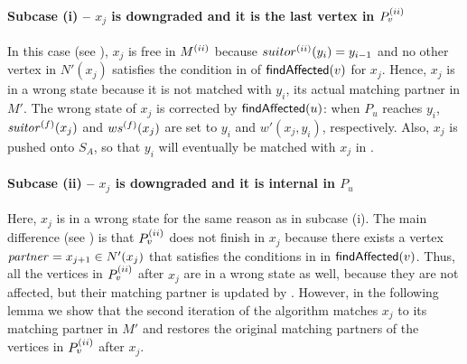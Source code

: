 \paragraph{Subcase (i) -- $x_j$ is downgraded and it is the last vertex in $P_v^{(ii)}$}
%
In this case (see ), $x_j$ is free in $M^{(ii)}$ because
$suitor^{(ii)}(y_i) = y_{i - 1}$ and no other vertex in $N'(x_j)$ satisfies
the condition in  of $\textsf{findAffected}(v)$
for $x_j$. Hence, $x_j$ is in a wrong state because it is not
matched with $y_i$, its actual matching partner in $M'$.
The wrong state of $x_j$ is corrected by $\textsf{findAffected}(u)$: when $P_u$ reaches
$y_i$, $\mathit{suitor}^{(f)}(x_j)$ and $ws^{(f)}(x_j)$ are set to $y_i$ and
$w'(x_j, y_i)$, respectively. Also, $x_j$ is pushed onto $S_A$,
so that $y_i$ will eventually be matched with $x_j$ in \updateaff.

\paragraph{Subcase (ii) -- $x_j$ is downgraded and it is internal in $P_u$}
%
Here, $x_j$ is in a wrong state for the same reason as in subcase (i).
The main difference (see )
is that $P_v^{(ii)}$ does not finish in $x_j$ because there exists
a vertex $\mathit{partner} = x_{j + 1} \in N'(x_j)$ that satisfies the conditions in
 in $\textsf{findAffected}(v)$.
Thus, all the vertices in $P_v^{(ii)}$ after $x_j$ are in a wrong state as well,
because they are not affected, but their matching partner is updated
by . However, in the following lemma we show
that the second iteration of the algorithm matches $x_j$ to its matching
partner in $M'$ and restores the original matching partners of the vertices in
$P_v^{(ii)}$ after $x_j$.

